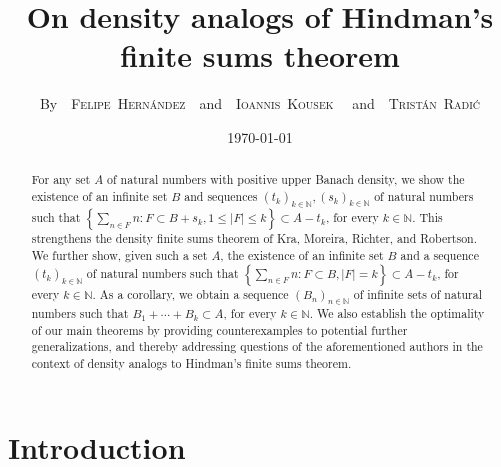\documentclass[letter, 11pt]{article}
\theoremstyle{definition}
\theoremstyle{plain}
\newcommand{\N}{\mathbb{N}}
\newcommand{\1}{\mathbbm{1}}
\begin{document}
\author{By~~{\scshape Felipe~Hernández}~~and~~{\scshape Ioannis~Kousek }~~and~~{\scshape Tristán~Radić}}
\date{\small \today}
\title{{\textbf{On density analogs of Hindman's finite sums theorem}}}
\maketitle


\begin{abstract}
For any set $A$ of natural numbers with positive upper Banach density, we show the existence of an infinite set $B$ and sequences $(t_k)_{k\in \N}, (s_k)_{k\in \N}$ of natural numbers such that $\left\{ \sum_{n \in F}n : F \subset B + s_k, 1 \leq |F|  \leq k \right\}\subset A-t_k$, for every $k\in \N$. This strengthens the density finite sums theorem of Kra, Moreira, Richter, and Robertson. We further show, given such a set $A$, the existence of an infinite set $B$ and a sequence 
$(t_k)_{k\in \N}$ of natural numbers such that $\left\{ \sum_{n \in F}n : F \subset B, |F|  = k \right\}\subset A-t_k$, for every $k\in \N$. As a corollary, we obtain a sequence $(B_n)_{n\in \N}$ of infinite sets of natural numbers such that $B_1+\cdots +B_k \subset A$, for every $k\in \N$. We also establish the optimality of our main theorems by providing 
counterexamples to potential further generalizations, and thereby addressing 
questions of the aforementioned authors in the context of density analogs to 
Hindman’s finite sums theorem.
\end{abstract}

\section{Introduction} 
\end{document}
